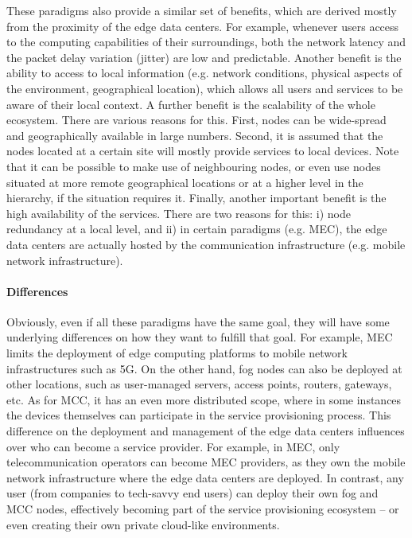 \documentclass[twocolumn,preprint,3p]{elsarticle}
\begin{document}
These paradigms also provide a similar set of benefits, which are derived mostly from the proximity of the edge data centers. For example, whenever users access to the computing capabilities of their surroundings, both the network latency and the packet delay variation (jitter) are low and predictable. Another benefit is the ability to access to local information (e.g. network conditions, physical aspects of the environment, geographical location), which allows all users and services to be aware of their local context. A further benefit is the scalability of the whole ecosystem. There are various reasons for this. First, nodes can be wide-spread and geographically available in large numbers. Second, it is assumed that the nodes located at a certain site will mostly provide services to local devices. Note that it can be possible to make use of neighbouring nodes, or even use nodes situated at more remote geographical locations or at a higher level in the hierarchy, if the situation requires it. Finally, another important benefit is the high availability of the services. There are two reasons for this: i) node redundancy at a local level, and ii) in certain paradigms (e.g. MEC), the edge data centers are actually hosted by the communication infrastructure (e.g. mobile network infrastructure).

\paragraph{Differences} Obviously, even if all these paradigms have the same goal, they will have some underlying differences on how they want to fulfill that goal. For example, MEC limits the deployment of edge computing platforms to mobile network infrastructures such as 5G. On the other hand, fog nodes can also be deployed at other locations, such as user-managed servers, access points, routers, gateways, etc. As for MCC, it has an even more distributed scope, where in some instances the devices themselves can participate in the service provisioning process. This difference on the deployment and management of the edge data centers influences over who can become a service provider. For example, in MEC, only telecommunication operators can become MEC providers, as they own the mobile network infrastructure where the edge data centers are deployed. In contrast, any user (from companies to tech-savvy end users) can deploy their own fog and MCC nodes, effectively becoming part of the service provisioning ecosystem -- or even creating their own private cloud-like environments.
\end{document}
